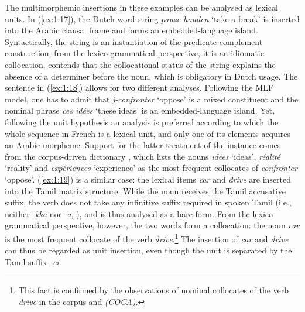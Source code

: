 \noindent The multimorphemic insertions in these examples can be analysed as lexical units. In (\ref{ex:1:17}), the Dutch word string \textit{pauze houden} `take a break' is inserted into the Arabic clausal frame and forms an embedded-language island. Syntactically, the string is an instantiation of the predicate-complement construction; from the lexico-grammatical perspective, it is an idiomatic collocation. \citet[246]{boumans-syntax-1998} contends that the collocational status of the string explains the absence of a determiner before the noun, which is obligatory in Dutch usage. The sentence in (\ref{ex:1:18}) allows for two different analyses. Following the MLF model, one has to admit that \textit{j-confronter} `oppose' is a mixed constituent and the nominal phrase \textit{ces id\'{e}es} `these ideas' is an embedded-language island. Yet, following the unit hypothesis an analysis is preferred according to which the whole sequence in French is a lexical unit, and only one of its elements acquires an Arabic morpheme. Support for the latter treatment of the instance comes from the corpus-driven dictionary , which lists the nouns \textit{idées} `ideas', \textit{réalité} `reality' and \textit{expériences} `experience' as the most frequent collocates of \textit{confronter} `oppose'. (\ref{ex:1:19}) is a similar case: the lexical items \textit{car} and \textit{drive} are inserted into the Tamil matrix structure. While the noun receives the Tamil accusative suffix, the verb does not take any infinitive suffix required in spoken Tamil (i.e., neither \mbox{-\textit{kka}} nor -\textit{a}, \citealt[cf.][73]{schiffman-tamil-1999}), and is thus analysed as a bare form. From the lexico-grammatical perspective, however, the two words form a collocation: the noun \textit{car} is the most frequent collocate of the verb \textit{drive}.\footnote{This fact is confirmed by the observations of nominal collocates of the verb \textit{drive} in the  corpus and  \textit{(COCA)}.}
The insertion of \textit{car} and \textit{drive} can thus be regarded as unit insertion, even though the unit is separated by the Tamil suffix \textit{-ei}. 

